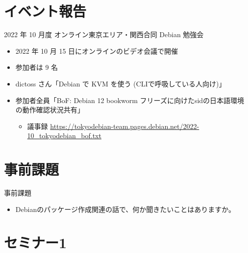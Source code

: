 \section{イベント報告}

\begin{frame}{2022 年 10 月度 オンライン東京エリア・関西合同 Debian 勉強会}
\begin{itemize}
\item 2022 年 10 月 15 日にオンラインのビデオ会議で開催
\item 参加者は 9 名
\item dictoss さん「Debian で KVM を使う (CLIで呼吸している人向け)」
\item 参加者全員「BoF: Debian 12 bookworm フリーズに向けたsidの日本語環境の動作確認状況共有」
  \begin{itemize}
    \item 議事録 \url{https://tokyodebian-team.pages.debian.net/2022-10_tokyodebian_bof.txt}
  \end{itemize}
\end{itemize}
\end{frame}


\section{事前課題}


\begin{frame}{事前課題}
  \begin{itemize}
  \item Debianのパッケージ作成関連の話で、何か聞きたいことはありますか。
  \end{itemize}
\end{frame}

{\footnotesize
 
}

%

\section{セミナー1}


